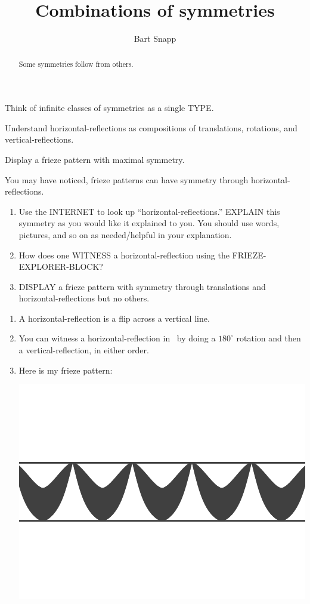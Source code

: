 \documentclass[noauthor,nooutcomes,12pt,hints,handout]{ximera}
\author{Bart Snapp}
\title{Combinations of symmetries}
\begin{document}
\begin{abstract}
  Some symmetries follow from others. 
\end{abstract}
\maketitle

\begin{listOutcomes}
\item Think of infinite classes of symmetries as a single TYPE.
\item Understand horizontal-reflections as compositions of
  translations, rotations, and vertical-reflections.
\item Display a frieze pattern with maximal symmetry.
\end{listOutcomes}
\mynewpage

\begin{question}
  You may have noticed, frieze patterns can have symmetry through
  horizontal-reflections.
  \begin{enumerate}
  \item Use the INTERNET to look up ``horizontal-reflections.''
    EXPLAIN this symmetry as you would like it explained to you. You
    should use words, pictures, and so on as needed/helpful in your
    explanation.
  \item How does one WITNESS a horizontal-reflection using the
    FRIEZE-EXPLORER-BLOCK?
  \item DISPLAY a frieze pattern with symmetry through translations
    and horizontal-reflections but no others.
  \end{enumerate}
  \begin{freeResponse}
    \begin{enumerate}
    \item A horizontal-reflection is a flip across a vertical line.
    \item You can witness a horizontal-reflection in \snap\ by doing a
      $180^\circ$ rotation and then a vertical-reflection, in either
      order.
    \item Here is my frieze pattern:
      \begin{center}
        \includegraphics[width=.6\textwidth]{ansFv.png}
      \end{center}
    \end{enumerate}
  \end{freeResponse}
\end{question}
\mynewpage
\end{document}
